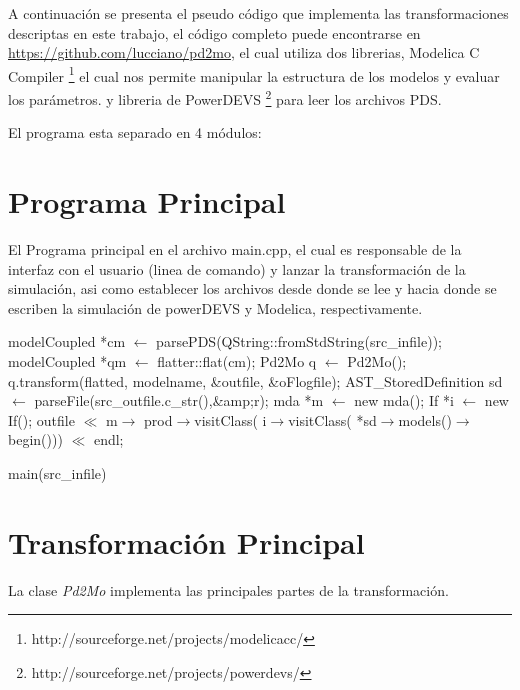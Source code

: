 	A continuación se presenta el pseudo código que implementa las transformaciones descriptas en este trabajo, 
	el código completo puede encontrarse en \url{https://github.com/lucciano/pd2mo}, el cual utiliza dos librerias, Modelica C Compiler 
	\footnote{http://sourceforge.net/projects/modelicacc/} el cual nos permite manipular la estructura de los modelos y evaluar los parámetros.
y libreria de PowerDEVS \footnote{http://sourceforge.net/projects/powerdevs/} para leer los archivos PDS.

El programa esta separado en 4 módulos:

\section{Programa Principal}

El Programa principal en el archivo main.cpp, el cual es responsable de la interfaz con el usuario (linea de comando) y lanzar la transformación de la simulación, asi como establecer los archivos desde donde se lee y hacia donde se escriben la simulación de powerDEVS y Modelica, respectivamente.


\begin{algorithm}[H]
\begin{algorithmic}[1]
\State modelCoupled *cm $\gets$ parsePDS(QString::fromStdString(src\_infile));
\State modelCoupled *qm $\gets$ flatter::flat(cm);
\State Pd2Mo q $\gets$ Pd2Mo();
\State q.transform(flatted, modelname, \&outfile, \&oFlogfile);
\State AST\_StoredDefinition sd $\gets$ parseFile(src\_outfile.c\_str(),\&amp;r);
\State mda *m $\gets$ new mda();
\State If *i $\gets$ new If();
\State outfile $\ll$ m$\rightarrow$ 
		{prod$\rightarrow$visitClass( i$\rightarrow$visitClass( 
			*sd$\rightarrow$models()$\rightarrow$begin()))} $\ll$ endl;

\end{algorithmic}
\caption{main(src\_infile)}
\end{algorithm}

\section{Transformación Principal}
La clase \emph{Pd2Mo} implementa las principales partes de la transformación.

